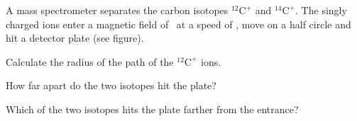 A mass spectrometer separates the carbon isotopes $^{12}\mathrm{C}^+$ and $^{14}\mathrm{C}^+$. The singly charged ions enter a magnetic field of \BO\ at a speed of \vO, move on a half circle and hit a detector plate (see figure).

\begin{center}
\end{center}

\begin{abcliste}
\abc Calculate the radius of the path of the $^{12}\mathrm{C}^+$ ions.

\abc How far apart do the two isotopes hit the plate?

\abc Which of the two isotopes hits the plate farther from the entrance?
\end{abcliste}
